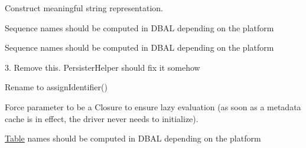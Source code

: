 \begin{DoxyRefList}
%
Construct meaningful string representation.  
\item[Global \mbox{\hyperlink{class_doctrine_1_1_o_r_m_1_1_mapping_1_1_class_metadata_info_adb5403824aab8d35365cc42e693fabde}{Class\+Metadata\+Info\+::get\+Sequence\+Name}} (Abstract\+Platform \$platform)]\label{todo__todo000016}%
%
Sequence names should be computed in DBAL depending on the platform  
\item[Global \mbox{\hyperlink{class_doctrine_1_1_o_r_m_1_1_mapping_1_1_class_metadata_info_a78a4bd579ccde55047538f51d19916f4}{Class\+Metadata\+Info\+::get\+Sequence\+Prefix}} (Abstract\+Platform \$platform)]\label{todo__todo000017}%
%
Sequence names should be computed in DBAL depending on the platform  
\item[Global \mbox{\hyperlink{class_doctrine_1_1_o_r_m_1_1_mapping_1_1_class_metadata_info_a9275e42d578aefabb6d796c6af740237}{Class\+Metadata\+Info\+::get\+Type\+Of\+Field}} (\$field\+Name)]\label{todo__todo000015}%
%
3. Remove this. Persister\+Helper should fix it somehow  
\item[Global \mbox{\hyperlink{class_doctrine_1_1_o_r_m_1_1_mapping_1_1_class_metadata_info_a614974767de148d8848984bb22cdb2ad}{Class\+Metadata\+Info\+::set\+Identifier\+Values}} (\$entity, array \$id)]\label{todo__todo000013}%
%
Rename to assign\+Identifier()  
\item[Global \mbox{\hyperlink{class_doctrine_1_1_o_r_m_1_1_configuration_ae4eb7ae5398bf03453c7017fc8360f25}{Configuration\+::set\+Metadata\+Driver\+Impl}} (Mapping\+Driver \$driver\+Impl)]\label{todo__todo000005}%
%
Force parameter to be a Closure to ensure lazy evaluation (as soon as a metadata cache is in effect, the driver never needs to initialize).  
\item[Global \mbox{\hyperlink{class_doctrine_1_1_o_r_m_1_1_mapping_1_1_default_quote_strategy_a9a41f117978bad1e9662feb3002f13ec}{Default\+Quote\+Strategy\+::get\+Table\+Name}} (\mbox{\hyperlink{class_doctrine_1_1_o_r_m_1_1_mapping_1_1_class_metadata}{Class\+Metadata}} \$class, Abstract\+Platform \$platform)]\label{todo__todo000018}%
%
\mbox{\hyperlink{class_doctrine_1_1_o_r_m_1_1_mapping_1_1_table}{Table}} names should be computed in DBAL depending on the platform  
\item[Global \mbox{\hyperlink{class_p_h_p_unit_1_1_util_1_1_annotation_1_1_doc_block_a1b3ee24e7c7ec93bf0acc5adbe3aa9b0}{Doc\+Block\+::REGEX\+\_\+\+DATA\+\_\+\+PROVIDER}} ]\label{todo__todo000048}%

\end{DoxyRefList}
